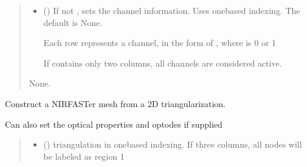 \documentclass[letterpaper,10pt,english]{sphinxmanual}
\begin{document}
\begin{fulllineitems}
\begin{fulllineitems}
\begin{quote}
\begin{description}
\begin{itemize}
\item {} 
\sphinxAtStartPar
{} (\sphinxstyleliteralemphasis{\sphinxupquote{, }}) \textendash{} 
\sphinxAtStartPar
If not , sets the channel information. Uses one\sphinxhyphen{}based indexing. The default is None.

\sphinxAtStartPar
Each row represents a channel, in the form of , where  is 0 or 1

\sphinxAtStartPar
If  contains only two columns, all channels are considered active.


\end{itemize}

\sphinxAtStartPar
None.

\end{description}\end{quote}

\end{fulllineitems}


\begin{fulllineitems}
\label{\detokenize{_autosummary/nirfasterff.base.dcs_mesh.dcsmesh:nirfasterff.base.dcs_mesh.dcsmesh.from_triangle}}
\pysigstartsignatures
\pysiglinewithargsret
{}
{\sphinxparamcomma {}\sphinxparamcomma {}\sphinxparamcomma {}\sphinxparamcomma {}\sphinxparamcomma {}}
{}
\pysigstopsignatures
\sphinxAtStartPar
Construct a NIRFASTer mesh from a 2D triangularization.

\sphinxAtStartPar
Can also set the optical properties and optodes if supplied
\begin{quote}\begin{description}
\begin{itemize}
\item {} 
\sphinxAtStartPar
{} () \textendash{} 
\sphinxAtStartPar
triangulation in one\sphinxhyphen{}based indexing. If three columns, all nodes will be labeled as region 1


\end{itemize}
\end{description}
\end{quote}
\end{fulllineitems}
\end{fulllineitems}
\end{document}
